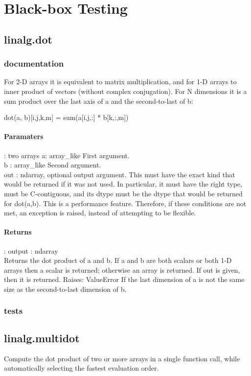 

	
	
\section{Black-box Testing}
\subsection{linalg.dot}
\subsubsection{documentation}
For 2-D arrays it is equivalent to matrix multiplication, and for 1-D arrays to inner product of vectors (without complex conjugation). For N dimensions it is a sum product over the last axis of a and the second-to-last of b:

    dot(a, b)[i,j,k,m] = sum(a[i,j,:] * b[k,:,m])
   \paragraph{Paramaters}: two arrays a: array\_like First argument.\\
b : array\_like Second argument.\\
out : ndarray, optional output argument. This must have the exact kind that would be returned if it was not used. In particular, it must have the right type, must be C-contiguous, and its dtype must be the dtype that would be returned for dot(a,b). This is a performance feature. Therefore, if these conditions are not met, an exception is raised, instead of attempting to be flexible.
    \paragraph{Returns}:    output : ndarray\\
Returns the dot product of a and b. If a and b are both scalars or both 1-D arrays then a scalar is returned; otherwise an array is returned. If out is given, then it is returned.
Raises: 
ValueError
If the last dimension of a is not the same size as the second-to-last dimension of b.


\subsubsection{tests}


\subsection{linalg.multidot}
Compute the dot product of two or more arrays in a single function call, while automatically selecting the fastest evaluation order.


